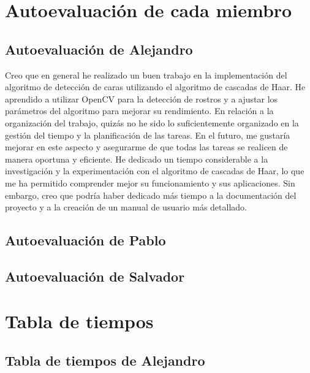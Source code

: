 \documentclass[a4paper]{article}
\begin{document}
\section{Autoevaluación de cada miembro}

\subsection{Autoevaluación de Alejandro}

Creo que en general he realizado un buen trabajo en la implementación del algoritmo de detección de caras utilizando el algoritmo de cascadas de Haar. He aprendido a utilizar OpenCV para la detección de rostros y a ajustar los parámetros del algoritmo para mejorar su rendimiento.
En relación a la organización del trabajo, quizás no he sido lo suficientemente organizado en la gestión del tiempo y la planificación de las tareas. En el futuro, me gustaría mejorar en este aspecto y asegurarme de que todas las tareas se realicen de manera oportuna y eficiente.
He dedicado un tiempo considerable a la investigación y la experimentación con el algoritmo de cascadas de Haar, lo que me ha permitido comprender mejor su funcionamiento y sus aplicaciones. Sin embargo, creo que podría haber dedicado más tiempo a la documentación del proyecto y a la creación de un manual de usuario más detallado.

\subsection{Autoevaluación de Pablo}

\subsection{Autoevaluación de Salvador}

\section{Tabla de tiempos}

\subsection{Tabla de tiempos de Alejandro}

\newpage
\end{document}
